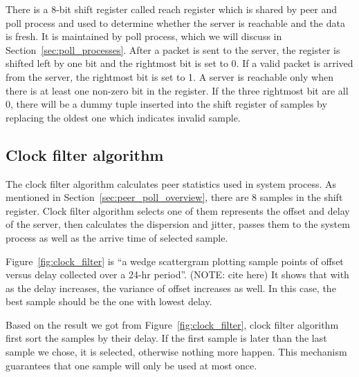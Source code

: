 There is a 8-bit shift register called reach register which is shared by peer
and poll process and used to determine whether the server is reachable and the
data is fresh. It is maintained by poll process, which we will discuss in
Section~\ref{sec:poll_processes}. After a packet is sent to the server, the
register is shifted left by one bit and the rightmost bit is set to 0. If a
valid packet is arrived from the server, the rightmost bit is set to 1. A
server is reachable only when there is at least one non-zero bit in the
register. If the three rightmost bit are all 0, there will be a dummy tuple
inserted into the shift register of samples by replacing the oldest one which
indicates invalid sample.

\subsection{Clock filter algorithm}%
\label{sub:clock_filter_algorithm}
The clock filter algorithm calculates peer statistics used in system process.
As mentioned in Section~\ref{sec:peer_poll_overview}, there are 8 samples in
the shift register. Clock filter algorithm selects one of them represents the
offset and delay of the server, then calculates the dispersion and jitter,
passes them to the system process as well as the arrive time of selected
sample.

Figure~\ref{fig:clock_filter} is ``a wedge scattergram plotting sample points of
offset versus delay collected over a 24-hr period''. (NOTE: cite here) It shows
that with as the delay increases, the variance of offset increases as well. In
this case, the best sample should be the one with lowest delay.



Based on the result we got from Figure~\ref{fig:clock_filter}, clock filter
algorithm first sort the samples by their delay. If the first sample is later
than the last sample we chose, it is selected, otherwise nothing more happen.
This mechanism guarantees that one sample will only be used at most once.


